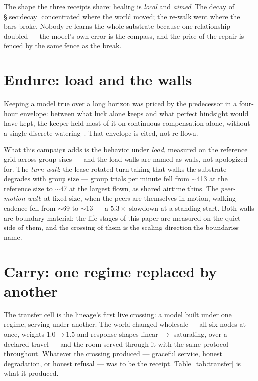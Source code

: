 \documentclass[11pt,a4paper]{article}
\begin{document}
The shape the three receipts share: healing is \emph{local} and
\emph{aimed}. The decay of \S\ref{sec:decay} concentrated where the
world moved; the re-walk went where the bars broke. Nobody re-learns
the whole substrate because one relationship doubled --- the model's
own error is the compass, and the price of the repair is fenced by
the same fence as the break.

\section{Endure: load and the walls}
\label{sec:endure}

Keeping a model true over a long horizon was priced by the
predecessor in a four-hour envelope: between what luck alone keeps
and what perfect hindsight would have kept, the keeper held most of
it on continuous compensation alone, without a single discrete
watering~\cite{p4}. That envelope is cited, not re-flown.

What this campaign adds is the behavior under \emph{load}, measured
on the reference grid across group sizes --- and the load walls are
named as walls, not apologized for. The \emph{turn wall}: the
lease-rotated turn-taking that walks the substrate degrades with
group size --- group trials per minute fell from $\sim$413 at the
reference size to $\sim$47 at the largest flown, as shared airtime
thins. The \emph{peer-motion wall}: at fixed size, when the peers are
themselves in motion, walking cadence fell from $\sim$69 to $\sim$13
--- a $5.3\times$ slowdown at a standing start. Both walls are
boundary material: the life stages of this paper are measured on the
quiet side of them, and the crossing of them is the scaling
direction the boundaries name.

\section{Carry: one regime replaced by another}
\label{sec:carry}

The transfer cell is the lineage's first live crossing: a model
built under one regime, serving under another. The world changed
wholesale --- all six nodes at once, weights $1.0 \to 1.5$ and
response shapes linear $\to$ saturating, over a declared travel ---
and the room served through it with the same protocol throughout.
Whatever the crossing produced --- graceful service, honest
degradation, or honest refusal --- was to be the receipt.
Table~\ref{tab:transfer} is what it produced.
\end{document}
